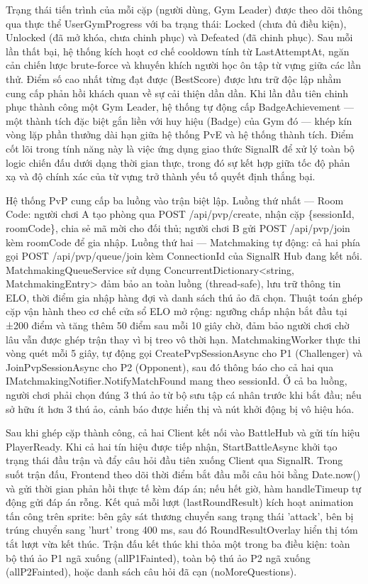 Trạng thái tiến trình của mỗi cặp (người dùng, Gym Leader) được theo dõi thông qua thực thể UserGymProgress với ba trạng thái: Locked (chưa đủ điều kiện), Unlocked (đã mở khóa, chưa chinh phục) và Defeated (đã chinh phục). Sau mỗi lần thất bại, hệ thống kích hoạt cơ chế cooldown tính từ LastAttemptAt, ngăn cản chiến lược brute-force và khuyến khích người học ôn tập từ vựng giữa các lần thử. Điểm số cao nhất từng đạt được (BestScore) được lưu trữ độc lập nhằm cung cấp phản hồi khách quan về sự cải thiện dần dần. Khi lần đầu tiên chinh phục thành công một Gym Leader, hệ thống tự động cấp BadgeAchievement — một thành tích đặc biệt gắn liền với huy hiệu (Badge) của Gym đó — khép kín vòng lặp phần thưởng dài hạn giữa hệ thống PvE và hệ thống thành tích. Điểm cốt lõi trong tính năng này là việc ứng dụng giao thức SignalR để xử lý toàn bộ logic chiến đấu dưới dạng thời gian thực, trong đó sự kết hợp giữa tốc độ phản xạ và độ chính xác của từ vựng trở thành yếu tố quyết định thắng bại.

Hệ thống PvP cung cấp ba luồng vào trận biệt lập. Luồng thứ nhất — Room Code: người chơi A tạo phòng qua POST /api/pvp/create, nhận cặp \{sessionId, roomCode\}, chia sẻ mã mời cho đối thủ; người chơi B gửi POST /api/pvp/join kèm roomCode để gia nhập. Luồng thứ hai — Matchmaking tự động: cả hai phía gọi POST /api/pvp/queue/join kèm ConnectionId của SignalR Hub đang kết nối. MatchmakingQueueService sử dụng ConcurrentDictionary<string, MatchmakingEntry> đảm bảo an toàn luồng (thread-safe), lưu trữ thông tin ELO, thời điểm gia nhập hàng đợi và danh sách thú ảo đã chọn. Thuật toán ghép cặp vận hành theo cơ chế cửa sổ ELO mở rộng: ngưỡng chấp nhận bắt đầu tại ±200 điểm và tăng thêm 50 điểm sau mỗi 10 giây chờ, đảm bảo người chơi chờ lâu vẫn được ghép trận thay vì bị treo vô thời hạn. MatchmakingWorker thực thi vòng quét mỗi 5 giây, tự động gọi CreatePvpSessionAsync cho P1 (Challenger) và JoinPvpSessionAsync cho P2 (Opponent), sau đó thông báo cho cả hai qua IMatchmakingNotifier.NotifyMatchFound mang theo sessionId. Ở cả ba luồng, người chơi phải chọn đúng 3 thú ảo từ bộ sưu tập cá nhân trước khi bắt đầu; nếu sở hữu ít hơn 3 thú ảo, cảnh báo được hiển thị và nút khởi động bị vô hiệu hóa.

Sau khi ghép cặp thành công, cả hai Client kết nối vào BattleHub và gửi tín hiệu PlayerReady. Khi cả hai tín hiệu được tiếp nhận, StartBattleAsync khởi tạo trạng thái đầu trận và đẩy câu hỏi đầu tiên xuống Client qua SignalR. Trong suốt trận đấu, Frontend theo dõi thời điểm bắt đầu mỗi câu hỏi bằng Date.now() và gửi thời gian phản hồi thực tế kèm đáp án; nếu hết giờ, hàm handleTimeup tự động gửi đáp án rỗng. Kết quả mỗi lượt (lastRoundResult) kích hoạt animation tấn công trên sprite: bên gây sát thương chuyển sang trạng thái 'attack', bên bị trúng chuyển sang 'hurt' trong 400 ms, sau đó RoundResultOverlay hiển thị tóm tắt lượt vừa kết thúc. Trận đấu kết thúc khi thỏa một trong ba điều kiện: toàn bộ thú ảo P1 ngã xuống (allP1Fainted), toàn bộ thú ảo P2 ngã xuống (allP2Fainted), hoặc danh sách câu hỏi đã cạn (noMoreQuestions).

